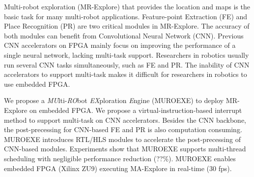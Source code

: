 Multi-robot exploration (MR-Explore) that provides the location and maps is the basic task for many multi-robot applications. 
Feature-point Extraction (FE) and Place Recognition (PR) are two critical modules in MR-Explore.
The accuracy of both modules can benefit from Convolutional Neural Network (CNN).
Previous CNN accelerators on FPGA mainly focus on improving the performance of a single neural network, lacking multi-task support.
Researchers in robotics usually run several CNN tasks simultaneously, such as FE and PR.
The inability of CNN accelerators to support multi-task makes it difficult for researchers in robotics to use embedded FPGA.

We propose a \textit{MU}lti-\textit{RO}bot \textit{EX}ploration \textit{E}ngine (MUROEXE) to deploy MR-Explore on embedded FPGA. 
We propose a virtual-instruction-based interrupt method to support multi-task on CNN accelerators.
Besides the CNN backbone, the post-precessing for CNN-based FE and PR is also computation consuming. 
MUROEXE introduces RTL/HLS modules to accelerate the post-precessing of CNN-based modules.
Experiments show that MUROEXE supports multi-thread scheduling with negligible performance reduction (??\%).
MUROEXE enables embedded FPGA (Xilinx ZU9) executing MA-Explore in real-time (30 fps).